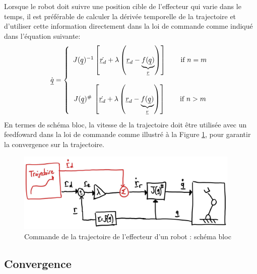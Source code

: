 Lorsque le robot doit suivre une position cible de l'effecteur qui varie dans le temps, il est préférable de calculer la dérivée temporelle de la trajectoire et d'utiliser cette information directement dans la loi de commande comme indiqué dans l'équation suivante:
\begin{align}
	\dot{\underline{q}} = \left\{ \begin{array}{c}
								J(\underline{q})^{-1} \left[ \dot{\underline{r}_d} + \lambda \left( \underline{r}_d  - \underbrace{f(\underline{q})}_{\underline{r}} \right) \right] \quad\quad \text{if $n=m$}
								\\ \\
								J(\underline{q})^{\#} \, \left[ \dot{\underline{r}_d} + \lambda \left( \underline{r}_d  - \underbrace{f(\underline{q})}_{\underline{r}} \right) \right]   \quad\quad \text{if $n>m$}
	\end{array}
	\right.
\end{align}
En termes de schéma bloc, la vitesse de la trajectoire doit être utilisée avec un feedfoward dans la loi de commande comme illustré à la Figure \ref{fig:robotspeedcontroltraj}, pour garantir la convergence sur la trajectoire.
\begin{figure}[H]
	\centering
	\includegraphics[width=0.95\textwidth]{fig/robotspeedcontroltraj.jpg}
	\caption{Commande de la trajectoire de l'effecteur d'un robot : schéma bloc}
	\label{fig:robotspeedcontroltraj}
\end{figure}


\subsection{Convergence}

